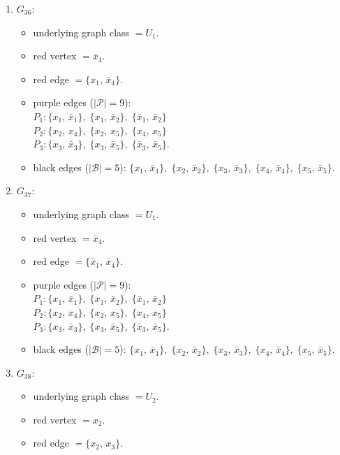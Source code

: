 \begin{enumerate}[leftmargin=*]
\begin{itemize}[leftmargin=*]
\end{itemize}
\item $G_{36}$:
\begin{itemize}[leftmargin=*]
\item underlying graph class $= U_1$.
\item red vertex $= \bar{x}_{4}$.
\item red edge $= \{x_{1},\,\bar{x}_{4}\}$.
\item purple edges ($|\mathcal{P}|=9$):\mbox{}\\
$P_{1}: \{x_{1},\,\bar{x}_{1}\},\; \{x_{1},\,\bar{x}_{2}\},\; \{\bar{x}_{1},\,\bar{x}_{2}\}$\\
$P_{2}: \{x_{2},\,x_{4}\},\; \{x_{2},\,x_{5}\},\; \{x_{4},\,x_{5}\}$\\
$P_{3}: \{x_{3},\,\bar{x}_{3}\},\; \{x_{3},\,\bar{x}_{5}\},\; \{\bar{x}_{3},\,\bar{x}_{5}\}$.
\item black edges ($|\mathcal{B}|=5$): $\{x_{1},\,\bar{x}_{1}\},\; \{x_{2},\,\bar{x}_{2}\},\; \{x_{3},\,\bar{x}_{3}\},\; \{x_{4},\,\bar{x}_{4}\},\; \{x_{5},\,\bar{x}_{5}\}$.
\end{itemize}
\item $G_{37}$:
\begin{itemize}[leftmargin=*]
\item underlying graph class $= U_1$.
\item red vertex $= \bar{x}_{4}$.
\item red edge $= \{\bar{x}_{1},\,\bar{x}_{4}\}$.
\item purple edges ($|\mathcal{P}|=9$):\mbox{}\\
$P_{1}: \{x_{1},\,\bar{x}_{1}\},\; \{x_{1},\,\bar{x}_{2}\},\; \{\bar{x}_{1},\,\bar{x}_{2}\}$\\
$P_{2}: \{x_{2},\,x_{4}\},\; \{x_{2},\,x_{5}\},\; \{x_{4},\,x_{5}\}$\\
$P_{3}: \{x_{3},\,\bar{x}_{3}\},\; \{x_{3},\,\bar{x}_{5}\},\; \{\bar{x}_{3},\,\bar{x}_{5}\}$.
\item black edges ($|\mathcal{B}|=5$): $\{x_{1},\,\bar{x}_{1}\},\; \{x_{2},\,\bar{x}_{2}\},\; \{x_{3},\,\bar{x}_{3}\},\; \{x_{4},\,\bar{x}_{4}\},\; \{x_{5},\,\bar{x}_{5}\}$.
\end{itemize}
\item $G_{38}$:
\begin{itemize}[leftmargin=*]
\item underlying graph class $= U_2$.
\item red vertex $= x_{2}$.
\item red edge $= \{x_{2},\,x_{3}\}$.

\end{itemize}
\end{enumerate}
